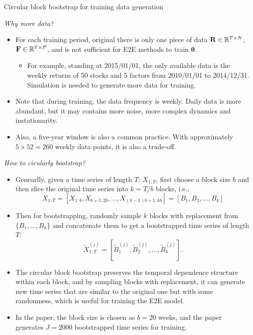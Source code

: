 \documentclass[10pt,aspectratio=169]{beamer}
\newcommand{\Nassets}{N}
\newcommand{\Param}{\theta}
\begin{document}
\begin{frame}[allowframebreaks]{Circular block bootstrap \parencite{PolitisRomano1991CBB} for training data generation}
  \small 

  \emph {Why more data?}

  \begin{itemize}
    \item For each training period, original there is only one piece of data $\mathbf{R} \in \RR^{T\times \Nassets}$, $\mathbf{F} \in \mathbb{R}^{T\times P}$, and is not sufficient for E2E methods to train $\boldsymbol \Param$.
    \begin{itemize}
      \small
      \item  For example, standing at 2015/01/01, the only available data is the weekly returns of 50 stocks and 5 factors from 2010/01/01 to 2014/12/31. Simulation is needed to generate more data for training.
    \end{itemize}
    \item Note that during training, the data frequency is weekly. Daily data is more abundant, but it may contains more noise, more complex dynamics and instationarity.
    \item Also, a five-year window is also a common practice. With approximately $5\times 52 = 260$ weekly data points, it is also a trade-off.
  \end{itemize}

  \break

  \emph{How to cicularly bootstrap?}
  \begin{itemize}
    \footnotesize
    \item Genearlly, given a time series of length $T$: $X_{1:T}$, first choose a block size $b$ and then slice the original time series into $k = T/b$ blocks, i.e., 
    \[
        X_{1:T} = [X_{1:b}, X_{b+1:2b}, \ldots, X_{(k-1)b+1:kb}] = [B_1, B_2, \ldots, B_k]
      \]
    \item Then for bootstrapping, randomly sample $k$ blocks with replacement from $\{B_1,\ldots,B_k\}$ and concatenate them to get a bootstrapped time series of length $T$: 
    \[\tilde{X}_{1:T}^{(j)} = [\tilde{B}_1^{(j)}, \tilde{B}_2^{(j)}, \ldots, \tilde{B}_k^{(j)}].\]

    \item The circular block bootstrap preserves the temporal dependence structure within each block, and by sampling blocks with replacement, it can generate new time series that are similar to the original one but with some randomness, which is useful for training the E2E model.

    \item In the paper, the block size is chosen as $b=20$ weeks, and the paper generates $J=2000$ bootstrapped time series for training.
  \end{itemize}


\end{frame}
\end{document}
